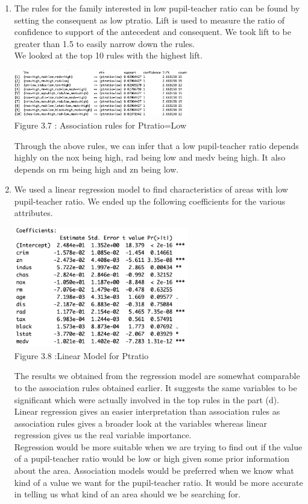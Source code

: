 \documentclass[11pt]{article}
\begin{document}
\begin{enumerate}
\begin{enumerate}
    \item The  rules for the family interested in low pupil-teacher ratio can be  found by setting the consequent as low ptratio. Lift is used to measure the ratio of confidence to support of the antecedent and consequent. We took lift to be greater than 1.5 to easily narrow down the rules.
    \\ We looked at the top 10 rules with the highest lift.
    \begin{center}
    \includegraphics[width=0.6\textwidth]{sshhsshh.png}
    \\\footnotesize Figure 3.7 : Association rules for Ptratio=Low 
\end{center}
    Through the above rules, we can infer that a low pupil-teacher ratio depends highly on the nox being high, rad being low and medv being high. It also depends on rm being high and zn being low.
    
    
    \item We used a linear regression model to find characteristics of areas  with low pupil-teacher ratio. We ended up the following coefficients for the various attributes.
    \begin{center}
    \includegraphics[width=0.6\textwidth]{shhshh.png}
    \\\footnotesize Figure 3.8 :Linear Model for Ptratio
\end{center}
    The results we obtained from the regression model are somewhat comparable to the association rules obtained earlier. It suggests the same variables
    to be significant which were actually involved in the top rules in the part (d). Linear regression gives an easier interpretation than association rules as association rules gives a broader look at the variables whereas linear regression gives us the real variable importance.
    \\Regression would be more suitable when we are trying to find out if the value of a pupil-teacher ratio would be low or high given some prior information about the area. Association models would be preferred when we know what kind of a value we want for the pupil-teacher ratio. It would be more accurate in telling us what kind of an area should we be searching for.
\end{enumerate}


\end{enumerate}
\end{document}
